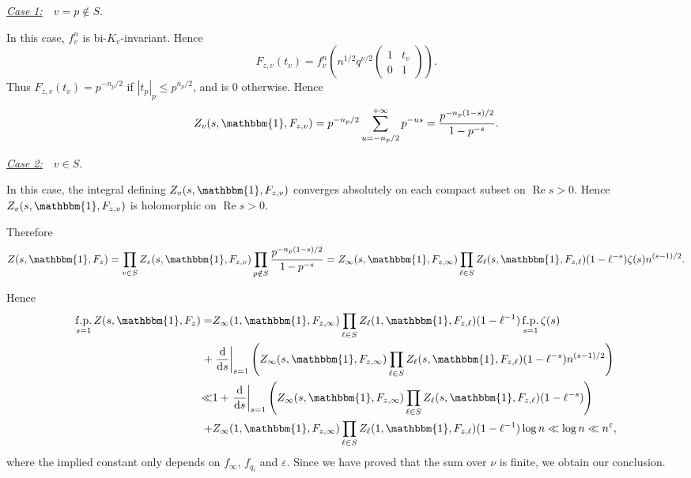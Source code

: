 \documentclass[10pt,oneside,reqno]{amsart}
\makeatletter
\newcommand\rmd{\mathrm{d}}
\newcommand\triv{\mathbbm{1}}
\renewcommand\Re{\mathop{\mathrm{Re}}}
\DeclareMathOperator\fp{f.p.}
\renewcommand\leq{\leqslant}
\theoremstyle{THEOREM}
\theoremstyle{DEFINITION}
\theoremstyle{EXERCISE}
\numberwithin{equation}{section}
\renewenvironment{proof}[1][\proofname]{\par
  \vspace{-6pt}
  \pushQED{\qed}
  \normalfont \topsep6\p@\@plus6\p@\relax
  \trivlist
  \item[\hskip\labelsep\rmfamily\bfseries
    #1\@addpunct{:}]\ignorespaces
}{
  \popQED\endtrivlist\@endpefalse
  \vspace{-6pt}
}
\makeatother
\begin{document}
\begin{proof}
\underline{\emph{Case 1:}}\ \ $v=p\notin S$.

In this case, $f_v^n$ is bi-$K_v$-invariant. Hence 
\[
F_{z,v}(t_v)=f_v^n\left(n^{1/2}q^{\nu/2}\begin{pmatrix}
                                 1 & t_v \\
                                 0 & 1 
                               \end{pmatrix}\right).
\]
Thus $F_{z,v}(t_v)=p^{-n_p/2}$ if $|t_p|_p\leq p^{n_p/2}$, and is $0$ otherwise. Hence
\[
Z_v(s,\triv,F_{z,v})=p^{-n_p/2}\sum_{u=-n_p/2}^{+\infty}p^{-us}=\frac{p^{-n_p(1-s)/2}}{1-p^{-s}}.
\]

\underline{\emph{Case 2:}}\ \ $v\in S$.

In this case, the integral defining $Z_v(s,\triv,F_{z,v})$ converges absolutely on each compact subset on $\Re s>0$. Hence $Z_v(s,\triv,F_{z,v})$ is holomorphic on $\Re s>0$. 

Therefore
\[
Z(s,\triv,F_z)=\prod_{v\in S}Z_v(s,\triv,F_{z,v})\prod_{p\notin S}\frac{p^{-n_p(1-s)/2}}{1-p^{-s}} =Z_\infty(s,\triv,F_{z,\infty})\prod_{\ell\in S}Z_\ell(s,\triv,F_{z,\ell})(1-\ell^{-s})\zeta(s)n^{(s-1)/2}.
\]

Hence
\begin{align*}
\fp_{s=1}Z(s,\triv,F_z)=&Z_\infty(1,\triv,F_{z,\infty})\prod_{\ell\in S}Z_\ell(1,\triv,F_{z,\ell})(1-\ell^{-1})\fp_{s=1}\zeta(s)\\
+&\left.\frac{\rmd}{\rmd s}\right|_{s=1}\left(Z_\infty(s,\triv,F_{z,\infty})\prod_{\ell\in S}Z_\ell(s,\triv,F_{z,\ell})(1-\ell^{-s})n^{(s-1)/2}\right)\\
\ll &1+\left.\frac{\rmd}{\rmd s}\right|_{s=1}\left(Z_\infty(s,\triv,F_{z,\infty})\prod_{\ell\in S}Z_\ell(s,\triv,F_{z,\ell})(1-\ell^{-s})\right)\\
+&Z_\infty(1,\triv,F_{z,\infty})\prod_{\ell\in S}Z_\ell(1,\triv,F_{z,\ell})(1-\ell^{-1})\log n 
\ll \log n\ll n^\varepsilon,
\end{align*}
where the implied constant only depends on $f_\infty$, $f_{q_i}$ and $\varepsilon$. Since we have proved that the sum over $\nu$ is finite, we obtain our conclusion.
\end{proof}
\end{document}

